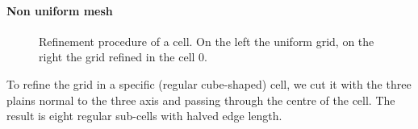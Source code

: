 \documentclass[11pt,a4paper]{article}
\begin{document}
\paragraph{Non uniform mesh}
\begin{figure}\captionsetup[subfloat]{labelformat=empty}
	\caption{Refinement procedure of a cell. On the left the uniform grid, on the right the grid refined in the cell 0.}
	\label{fig:octant_refinement}
\end{figure}\captionsetup[subfloat]{labelformat=parens}
To refine the grid in a specific (regular cube-shaped) cell, we cut it with the three plains normal to the three axis and passing through the centre of the cell. The result is eight regular sub-cells with halved edge length.\\
\end{document}
